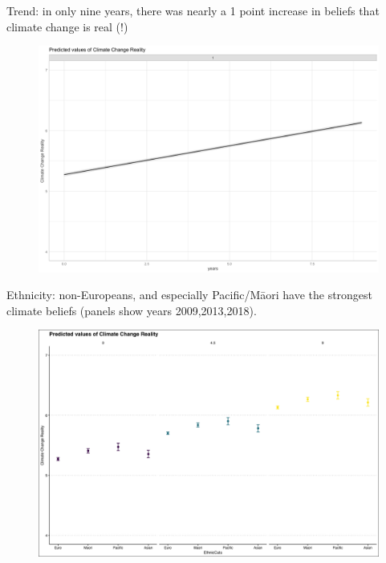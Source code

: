 \documentclass{beamer}
\begin{document}
\begin{frame}{Trend: in only nine years, there was nearly a 1 point increase in beliefs that climate change is real (!)}
\begin{figure}
\includegraphics[width=.8\textwidth,height=\textheight,keepaspectratio]{Figures/REAL_TIME.png}
\end{figure}
\end{frame}


\begin{frame}{Ethnicity: non-Europeans, and especially Pacific/Māori have the strongest climate beliefs (panels show years 2009,2013,2018).}
\begin{figure}
\includegraphics[width=.8\textwidth,height=\textheight,keepaspectratio]{Figures/REAL_EthnicCats_T.png}
\end{figure}
\end{frame}
\end{document}
